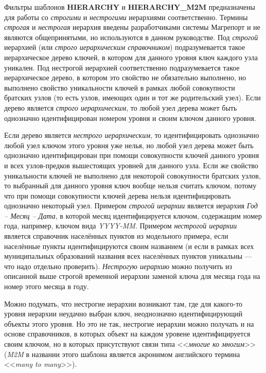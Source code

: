 \documentclass[../user-manual.tex]{subfiles}
\begin{document}
	\begin{concept}
		Фильтры шаблонов \textbf{HIERARCHY} и \textbf{HIERARCHY\_M2M} предназначены для работы со \textit{строгими} и \textit{нестрогими} иерархиями соответственно. Термины \textit{строгая} и \textit{нестрогая} иерархия введены разработчиками системы Магрепорт и не являются общепринятыми, но используются в данном руководстве. Под \textit{строгой} иерархией (или \textit{строго иерархическим справочником}) подразумевается такое иерархическое дерево ключей, в котором для данного уровня ключ каждого узла уникален. Под нестрогой иерархией соответственно подразумевается такое иерархическое дерево, в котором это свойство не обязательно выполнено, но выполнено свойство уникальности ключей в рамках любой совокупности братских узлов (то есть узлов, имеющих один и тот же родительский узел). Если дерево является \textit{строго иерархическим}, то любой узел дерева может быть однозначно идентифицирован номером уровня и своим ключом данного уровня. 
		
		Если дерево является \textit{нестрого иерархическим}, то идентифицировать однозначно любой узел ключом этого уровня уже нелья, но любой узел дерева может быть однозначно идентифицирован при помощи совокупности ключей данного уровня и всех узлов-предков вышестоящих уровней для данного узла. Если же свойство уникальности ключей не выполнено для некоторой совокупности братских узлов, то выбранный для данного уровня ключ вообще нельзя считать ключом, потому что при помощи совокупности ключей дерева нельзя идентифицировать однозначно некоторый узел. Примером \textit{строгой иерархии} является иерархия \textit{Год -- Месяц -- Дата}, в которой месяц идентифицируется ключом, содержащим номер года, например, ключом вида \textit{YYYY-MM}. Примером \textit{нестрогой иерархии} является справочник населённых пунктов из модельного примера, если населённые пункты идентифицируются своим названием (и если в рамках всех муниципальных образований названия всех населённых пунктов уникальны --- что надо отдельно проверить). \textit{Нестрогую иерархию} можно получить из описанной выше строгой временн\textit{о}й иерархии заменой ключа для месяца года на номер этого месяца в году.
		
		Можно подумать, что нестрогие иерархии возникают там, где для какого-то уровня иерархии неудачно выбран ключ, неоднозначно идентифицирующий объекты этого уровня. Но это не так, нестрогие иерархии можно получать и на основе справочников, в которых объект на каждом уровене идентифицируется своим ключом, но в которых присутствуют связи типа <<\textit{многие ко многим}>> (\textit{M2M} в названии этого шаблона является акронимом английского термина <<\textit{many to many}>>). 
		
	\end{concept}
\end{document}
